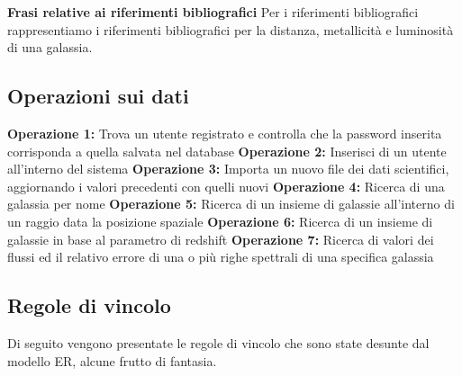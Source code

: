 \documentclass[12pt,a4paper,onecolumn,x11names]{article}
\begin{document}
	\begin{framed}
		\begin{flushleft}
			\textbf{Frasi relative ai riferimenti bibliografici}\newline
			Per i riferimenti bibliografici rappresentiamo i riferimenti bibliografici per la distanza, metallicità e luminosità di una galassia.
		\end{flushleft}
	\end{framed}
	
	\subsection{Operazioni sui dati}
		\begin{flushleft}
			\textbf{Operazione 1:} Trova un utente registrato e controlla che la password inserita corrisponda a quella salvata nel database\newline\newline
			\textbf{Operazione 2:} Inserisci di un utente all'interno del sistema\newline\newline
			\textbf{Operazione 3:} Importa un nuovo file dei dati scientifici, aggiornando i valori precedenti con quelli nuovi\newline\newline
			\textbf{Operazione 4:} Ricerca di una galassia per nome\newline\newline
			\textbf{Operazione 5:} Ricerca di un insieme di galassie all'interno di un raggio data la posizione spaziale\newline\newline
			\textbf{Operazione 6:} Ricerca di un insieme di galassie in base al parametro di redshift\newline\newline
			\textbf{Operazione 7:} Ricerca di valori dei flussi ed il relativo errore di una o più righe spettrali di una specifica galassia
		\end{flushleft}
	
	\subsection{Regole di vincolo}
		Di seguito vengono presentate le regole di vincolo che sono state desunte dal modello ER, alcune frutto di fantasia.
		
\end{document}
